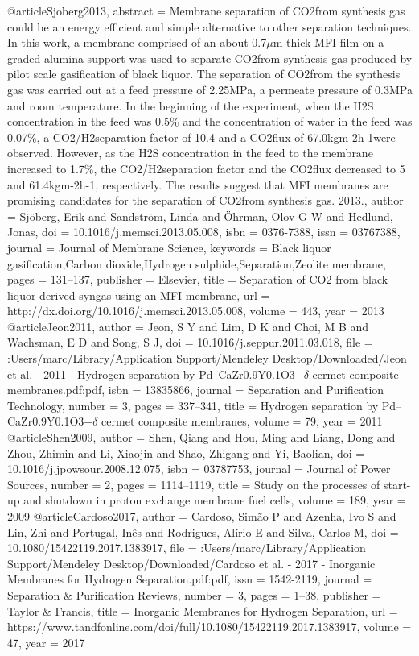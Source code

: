 @article{Sjoberg2013,
abstract = {Membrane separation of CO2from synthesis gas could be an energy efficient and simple alternative to other separation techniques. In this work, a membrane comprised of an about 0.7$\mu$m thick MFI film on a graded alumina support was used to separate CO2from synthesis gas produced by pilot scale gasification of black liquor. The separation of CO2from the synthesis gas was carried out at a feed pressure of 2.25MPa, a permeate pressure of 0.3MPa and room temperature. In the beginning of the experiment, when the H2S concentration in the feed was 0.5{\%} and the concentration of water in the feed was 0.07{\%}, a CO2/H2separation factor of 10.4 and a CO2flux of 67.0kgm-2h-1were observed. However, as the H2S concentration in the feed to the membrane increased to 1.7{\%}, the CO2/H2separation factor and the CO2flux decreased to 5 and 61.4kgm-2h-1, respectively. The results suggest that MFI membranes are promising candidates for the separation of CO2from synthesis gas. {\textcopyright} 2013.},
author = {Sj{\"{o}}berg, Erik and Sandstr{\"{o}}m, Linda and {\"{O}}hrman, Olov G W and Hedlund, Jonas},
doi = {10.1016/j.memsci.2013.05.008},
isbn = {0376-7388},
issn = {03767388},
journal = {Journal of Membrane Science},
keywords = {Black liquor gasification,Carbon dioxide,Hydrogen sulphide,Separation,Zeolite membrane},
pages = {131--137},
publisher = {Elsevier},
title = {{Separation of CO2 from black liquor derived syngas using an MFI membrane}},
url = {http://dx.doi.org/10.1016/j.memsci.2013.05.008},
volume = {443},
year = {2013}
}
@article{Jeon2011,
author = {Jeon, S Y and Lim, D K and Choi, M B and Wachsman, E D and Song, S J},
doi = {10.1016/j.seppur.2011.03.018},
file = {:Users/marc/Library/Application Support/Mendeley Desktop/Downloaded/Jeon et al. - 2011 - Hydrogen separation by Pd–CaZr0.9Y0.1O3−$\delta$ cermet composite membranes.pdf:pdf},
isbn = {13835866},
journal = {Separation and Purification Technology},
number = {3},
pages = {337--341},
title = {{Hydrogen separation by Pd–CaZr0.9Y0.1O3−$\delta$ cermet composite membranes}},
volume = {79},
year = {2011}
}
@article{Shen2009,
author = {Shen, Qiang and Hou, Ming and Liang, Dong and Zhou, Zhimin and Li, Xiaojin and Shao, Zhigang and Yi, Baolian},
doi = {10.1016/j.jpowsour.2008.12.075},
isbn = {03787753},
journal = {Journal of Power Sources},
number = {2},
pages = {1114--1119},
title = {{Study on the processes of start-up and shutdown in proton exchange membrane fuel cells}},
volume = {189},
year = {2009}
}
@article{Cardoso2017,
author = {Cardoso, Sim{\~{a}}o P and Azenha, Ivo S and Lin, Zhi and Portugal, In{\^{e}}s and Rodrigues, Al{\'{i}}rio E and Silva, Carlos M},
doi = {10.1080/15422119.2017.1383917},
file = {:Users/marc/Library/Application Support/Mendeley Desktop/Downloaded/Cardoso et al. - 2017 - Inorganic Membranes for Hydrogen Separation.pdf:pdf},
issn = {1542-2119},
journal = {Separation {\&} Purification Reviews},
number = {3},
pages = {1--38},
publisher = {Taylor {\&} Francis},
title = {{Inorganic Membranes for Hydrogen Separation}},
url = {https://www.tandfonline.com/doi/full/10.1080/15422119.2017.1383917},
volume = {47},
year = {2017}
}
